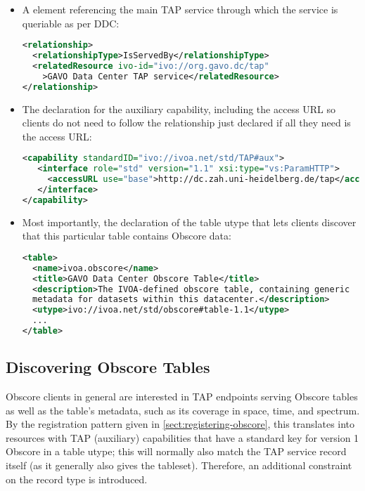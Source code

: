 \documentclass[11pt,a4paper]{ivoa}
\begin{document}
\begin{itemize}
\item A  element referencing the main TAP service
through which the service is queriable as per DDC:
\begin{lstlisting}[language=XML,basicstyle=\footnotesize]
<relationship>
  <relationshipType>IsServedBy</relationshipType>
  <relatedResource ivo-id="ivo://org.gavo.dc/tap"
    >GAVO Data Center TAP service</relatedResource>
</relationship>
\end{lstlisting}

\item The declaration for the auxiliary capability, including the access
URL so clients do not need to follow the relationship just declared if
all they need is the access URL:
\begin{lstlisting}[language=XML,basicstyle=\footnotesize]
<capability standardID="ivo://ivoa.net/std/TAP#aux">
   <interface role="std" version="1.1" xsi:type="vs:ParamHTTP">
     <accessURL use="base">http://dc.zah.uni-heidelberg.de/tap</accessURL>
   </interface>
</capability>
\end{lstlisting}

\item Most importantly, the declaration of the table utype that lets
clients discover that this particular table contains Obscore data:
\begin{lstlisting}[language=XML,basicstyle=\footnotesize]
<table>
  <name>ivoa.obscore</name>
  <title>GAVO Data Center Obscore Table</title>
  <description>The IVOA-defined obscore table, containing generic
  metadata for datasets within this datacenter.</description>
  <utype>ivo://ivoa.net/std/obscore#table-1.1</utype>
  ...
</table>
\end{lstlisting}
\end{itemize}

\subsection{Discovering Obscore Tables}
\label{sect:finding-obscore}

Obscore clients in general are interested in TAP endpoints serving Obscore
tables as well as the table's metadata, such as its coverage in space,
time, and spectrum.  By the  registration pattern given in
\ref{sect:registering-obscore}, this translates into resources with TAP
(auxiliary) capabilities that have a standard key for version 1 Obscore
in a table utype; this will normally also match the TAP service record
itself (as it generally also gives the tableset). Therefore, an
additional constraint on the record type is introduced.
\end{document}
